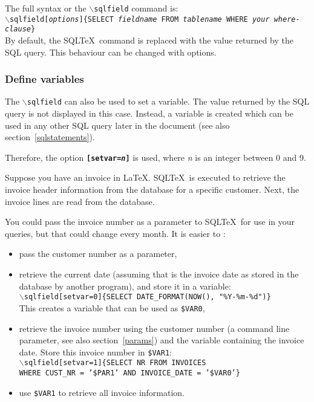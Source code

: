 \documentclass{article}
\newcommand{\bs}{\ensuremath{\backslash}}
\newcommand{\vs}{\vspace{3mm}}
\begin{document}
The full syntax or the \texttt{\bs sqlfield} command is:\\
\texttt{\bs sqlfield[\textit{options}]\{SELECT \textit{fieldname} FROM \textit{tablename} WHERE \textit{your where-clause}\}} \\
By default, the SQL\TeX\ command is replaced with the value returned by the SQL query. This behaviour
can be changed with options.


\subsubsection{Define variables}\label{vars}

The \texttt{\bs sqlfield} can also be used to set a variable. The value returned by the SQL query is not
displayed in this case. Instead, a variable is created which can be used in any other SQL query later in
the document (see also section~\ref{sqlstatements}).

Therefore, the option \texttt{\textbf{[setvar=\textit{n}]}} is used, where \textit{n} is an integer between
0 and 9.

\vs

Suppose you have an invoice in \LaTeX. SQL\TeX\ is executed to retrieve the invoice header information
from the database for a specific customer. Next, the invoice lines are read from the database.

You could pass the invoice number as a parameter to SQL\TeX\ for use in your queries, but that could
change every month. It is easier to :\\
\begin{itemize}
\item pass the customer number as a parameter,
\item retrieve the current date (assuming that is the invoice date as stored in
the database by another program), and store it in a variable: \\
\texttt{\bs sqlfield[setvar=0]\{SELECT DATE\_FORMAT(NOW(), "\%Y-\%m-\%d")\}} \\
This creates a variable that can be used as \texttt{\$VAR0},
\item retrieve the invoice number using the customer number (a command line parameter,
see also section~\ref{params}) and the variable containing the invoice date.
Store this invoice number in \texttt{\$VAR1}: \\
\texttt{\bs sqlfield[setvar=1]\{SELECT NR FROM INVOICES \\
WHERE CUST\_NR = '\$PAR1' AND INVOICE\_DATE = '\$VAR0'\}}
\item use \texttt{\$VAR1} to retrieve all invoice information.
\end{itemize}
\end{document}
